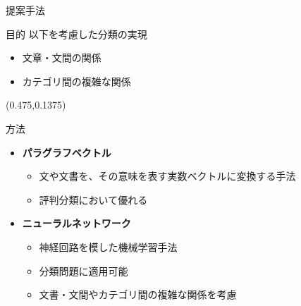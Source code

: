 \documentclass[aspectratio=43,unicode,10pt]{beamer}
\newcommand{\itemtitle}[1]{\textbf{#1}\\}
\begin{document}
\begin{frame}{提案手法}{}
  \begin{block}{目的}
    以下を考慮した分類の実現
    \begin{itemize}
      \item 文章・文間の関係
      \item カテゴリ間の複雑な関係
    \end{itemize}
  \end{block}
  \begin{textblock}{0.575}(0.475,0.1375)
    \fboxsep=2mm %
  \end{textblock}
  \begin{block}{方法}
    \begin{itemize}
      \item \itemtitle{パラグラフベクトル}
        \begin{itemize}
          \item 文や文書を、その意味を表す実数ベクトルに変換する手法
          \item 評判分類において優れる
        \end{itemize}
      \item \itemtitle{ニューラルネットワーク}
        \begin{itemize}
          \item 神経回路を模した機械学習手法
          \item 分類問題に適用可能
          \item 文書・文間やカテゴリ間の複雑な関係を考慮
        \end{itemize}
    \end{itemize}
  \end{block}
\end{frame}
\end{document}
